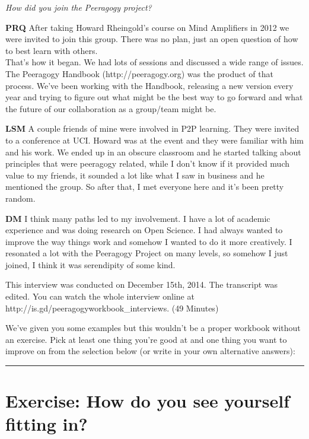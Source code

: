 \emph{How did you join the Peeragogy project?}

\textbf{PRQ} After taking Howard Rheingold's course on Mind Amplifiers
in 2012 we were invited to join this group. There was no plan, just an
open question of how to best learn with others.\\
That's how it began. We had lots of sessions and discussed a wide range
of issues. The Peeragogy Handbook (http://peeragogy.org) was the product
of that process. We've been working with the Handbook, releasing a new
version every year and trying to figure out what might be the best way
to go forward and what the future of our collaboration as a group/team
might be.

\textbf{LSM} A couple friends of mine were involved in P2P learning.
They were invited to a conference at UCI. Howard was at the event and
they were familiar with him and his work. We ended up in an obscure
classroom and he started talking about principles that were peeragogy
related, while I don't know if it provided much value to my friends, it
sounded a lot like what I saw in business and he mentioned the group. So
after that, I met everyone here and it's been pretty random.

\textbf{DM} I think many paths led to my involvement. I have a lot of
academic experience and was doing research on Open Science. I had always
wanted to improve the way things work and somehow I wanted to do it more
creatively. I resonated a lot with the Peeragogy Project on many levels,
so somehow I just joined, I think it was serendipity of some kind.

This interview was conducted on December 15th, 2014. The transcript was
edited. You can watch the whole interview online at
http://is.gd/peeragogyworkbook\_interviews. (49 Minutes)

We've given you some examples but this wouldn't be a proper workbook
without an exercise. Pick at least one thing you're good at and one
thing you want to improve on from the selection below (or write in your
own alternative answers):

\begin{center}\rule{0.5\linewidth}{0.5pt}\end{center}

\hypertarget{exercise-how-do-you-see-yourself-fitting-in}{%
\section{Exercise: How do you see yourself fitting
in?}\label{exercise-how-do-you-see-yourself-fitting-in}}

